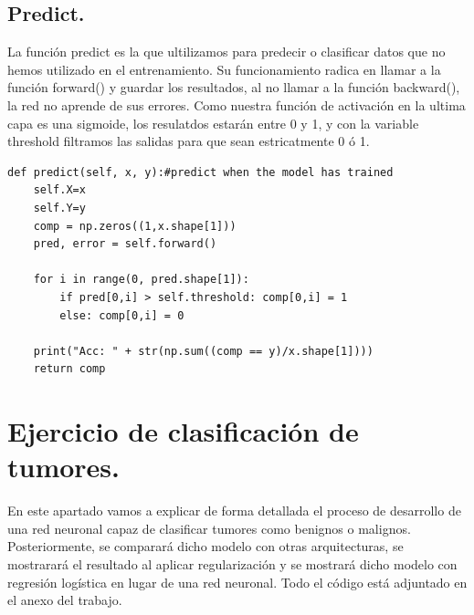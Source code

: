 \documentclass[a4paper,10pt]{article}
\begin{document}
\subsection{Predict.}
\noindent
La función predict es la que ultilizamos para predecir o clasificar datos que no hemos utilizado en el entrenamiento. Su funcionamiento radica en llamar a la función forward() y guardar los resultados, al no llamar a la función backward(), la red no aprende de sus errores. Como nuestra función de activación en la ultima capa es una sigmoide, los resulatdos estarán entre 0 y 1, y con la variable threshold filtramos las salidas para que sean estricatmente 0 ó 1.  
\begin{lstlisting}
def predict(self, x, y):#predict when the model has trained
    self.X=x
    self.Y=y
    comp = np.zeros((1,x.shape[1]))
    pred, error = self.forward()    
    
    for i in range(0, pred.shape[1]):
        if pred[0,i] > self.threshold: comp[0,i] = 1
        else: comp[0,i] = 0
    
    print("Acc: " + str(np.sum((comp == y)/x.shape[1]))) 
    return comp
\end{lstlisting}
\newpage
\section{Ejercicio de clasificación de tumores.}
En este apartado vamos a explicar de forma detallada el proceso de desarrollo de una red neuronal capaz de clasificar tumores como benignos o malignos. Posteriormente, se comparará dicho modelo con otras arquitecturas, se mostrarará el resultado al aplicar regularización y se mostrará dicho modelo con regresión logística en lugar de una red neuronal. Todo el código está adjuntado en el anexo del trabajo.
\end{document}

